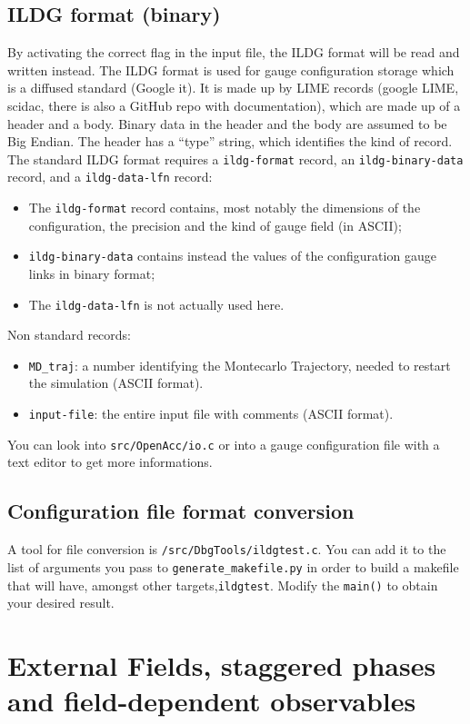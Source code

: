\subsection{ILDG format (binary)}
By activating the correct flag in the input file, the ILDG format will be read 
and written instead. The ILDG format is used for gauge configuration 
storage which is a diffused standard (Google it). It is made up by LIME records 
(google LIME, scidac, there is also a GitHub repo with documentation), which 
are made up of a header and a body. Binary data in the header and the body are 
assumed to be Big Endian. The header has a ``type'' string, which identifies 
the 
kind of record.
The standard ILDG format requires a \texttt{ildg-format} record, an 
\texttt{ildg-binary-data} record, and a \texttt{ildg-data-lfn} record:
\begin{itemize}
    \item The \texttt{ildg-format} record contains, most notably the dimensions of 
        the configuration, the precision and the kind of gauge field (in ASCII);
    \item \texttt{ildg-binary-data} contains instead the values of the 
        configuration gauge links in binary format;
    \item The \texttt{ildg-data-lfn} is not actually used here.
\end{itemize}
Non standard records:
\begin{itemize}
    \item \verb|MD_traj|: a number identifying the Montecarlo Trajectory, needed 
        to restart the simulation (ASCII format).
    \item \verb|input-file|: the entire input file with comments (ASCII format).
\end{itemize}
You can look into \verb|src/OpenAcc/io.c| or into a gauge configuration 
file with a text editor to get more informations.

\subsection{Configuration file format conversion}
A tool for file conversion is \verb|/src/DbgTools/ildgtest.c|. You can add it 
to the list of arguments you pass to \verb|generate_makefile.py| in order to 
build a makefile that will have, amongst other targets,\verb|ildgtest|.
Modify the \verb|main()| to obtain your desired result.

\section{External Fields, staggered phases and field-dependent observables}

